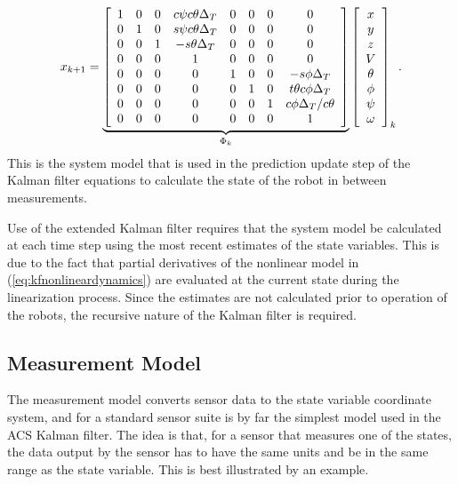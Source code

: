 \begin{align}
\label{eq:kfSystemModelWithAssumptions}
x_{k+1} = 
\underbrace{\left[\begin{array}{c c c c c c c c}
1 & 0 & 0 & c\psi c\theta \Delta_T & 0 & 0 & 0 & 0 \\
0 & 1 & 0 & s\psi c\theta \Delta_T & 0 & 0 & 0 & 0\\
0 & 0 & 1 & -s\theta \Delta_T & 0 & 0 & 0 & 0\\
0 & 0 & 0 & 1 & 0 & 0 & 0 & 0 \\
0 & 0 & 0 & 0 & 1 & 0 & 0 & -s\phi \Delta_T \\
0 & 0 & 0 & 0 & 0 & 1 & 0 & t\theta c\phi \Delta_T \\
0 & 0 & 0 & 0 & 0 & 0 & 1 & c\phi \Delta_T/c\theta \\
0 & 0 & 0 & 0 & 0 & 0 & 0 & 1
\end{array}\right]}_{\Phi_k}
\left[\begin{array}{c}
x \\ y \\ z \\ V \\ \theta \\ \phi \\ \psi \\ \omega
\end{array}\right]_k.
\end{align}
This is the system model that is used in the prediction update step of the Kalman filter equations to calculate the state of the robot in between measurements.

Use of the extended Kalman filter requires that the system model be calculated at each time step using the most recent estimates of the state variables. This is due to the fact that partial derivatives of the nonlinear model in (\ref{eq:kfnonlineardynamics}) are evaluated at the current state during the linearization process. Since the estimates are not calculated prior to operation of the robots, the recursive nature of the Kalman filter is required.

\subsection{Measurement Model}
\label{sec:kfMeasurementModel}
The measurement model converts sensor data to the state variable coordinate system, and for a standard sensor suite is by far the simplest model used in the ACS Kalman filter. The idea is that, for a sensor that measures one of the states, the data output by the sensor has to have the same units and be in the same range as the state variable. This is best illustrated by an example.

